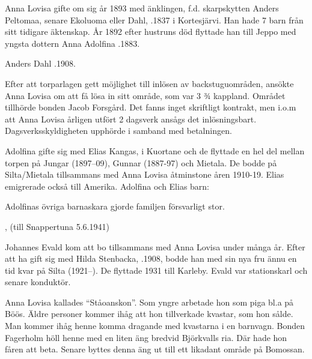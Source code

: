Anna Lovisa gifte om sig år 1893 med änklingen, f.d. skarpskytten Anders Peltomaa, senare Ekoluoma eller Dahl, .1837 i Kortesjärvi. Han hade 7 barn från sitt tidigare äktenskap. År 1892 efter hustruns död flyttade han till Jeppo med yngsta dottern Anna Adolfina .1883.

Anders Dahl .1908.

Efter att torparlagen gett möjlighet till inlösen av backstuguområden, ansökte Anna Lovisa om att få lösa in sitt område, som var 3 ¾ kappland. Området tillhörde bonden Jacob Forsgård. Det fanns inget skriftligt kontrakt, men i.o.m att Anna Lovisa årligen utfört 2 dagsverk ansågs det inlösningsbart. Dagsverksskyldigheten upphörde i samband med betalningen.

Adolfina gifte sig med Elias Kangas,  i Kuortane och de flyttade en hel del mellan torpen på Jungar (1897--09), Gunnar (1887-97) och Mietala. De bodde på Silta/Mietala tillsammans med Anna Lovisa åtminstone åren 1910-19. Elias emigrerade också till Amerika. Adolfina och Elias barn:
\begin{jhchildren}
  \item {}
  \item {}
\end{jhchildren}
Adolfinas övriga barnaskara gjorde familjen försvarligt stor.
\begin{jhchildren}
  \item {}
  \item {}
  \item {}
  \item {}
  \item {}, (till Snappertuna 5.6.1941)
  \item {}
\end{jhchildren}
Johannes Evald kom att bo tillsammans med Anna Lovisa under många år. Efter att ha gift sig med Hilda Stenbacka,  .1908, bodde han med sin nya fru ännu en tid kvar på Silta (1921--). De flyttade 1931 till Karleby. Evald var stationskarl och senare konduktör.

Anna Lovisa kallades ``Ståoanskon''. Som yngre arbetade hon som piga bl.a på Böös. Äldre personer kommer ihåg att hon tillverkade kvastar, som hon sålde. Man kommer ihåg henne komma dragande med kvastarna i en barnvagn. Bonden Fagerholm höll henne med en liten äng bredvid Björkvalls ria. Där hade hon fåren att beta.  Senare byttes denna äng ut till ett likadant område på Bomossan.

